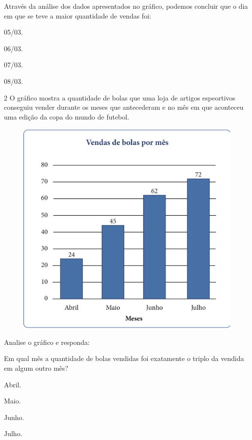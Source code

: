 Através da análise dos dados apresentados no gráfico, podemos concluir
que o dia em que se teve a maior quantidade de vendas foi:

\begin{escolha}
\item
  05/03.
\item
  06/03.
\item
  07/03.
\item
  08/03.
\end{escolha}


\pagebreak
\num{2} O gráfico mostra a quantidade de bolas que uma loja de
artigos espeortivos conseguiu vender durante os meses que antecederam e no mês em que aconteceu uma edição da copa do mundo de futebol.

\begin{figure}[htpb!]
\centering
\includegraphics[width=\textwidth]{../ilustracoes/MAT5/SAEB_5ANO_MAT_figura65.png}
\end{figure}

Analise o gráfico e responda:

Em qual mês a quantidade de bolas vendidas foi exatamente o triplo da vendida em algum outro mês?

\begin{escolha}
\item
  Abril.
\item
  Maio.
\item
  Junho.
\item
  Julho.
\end{escolha}


